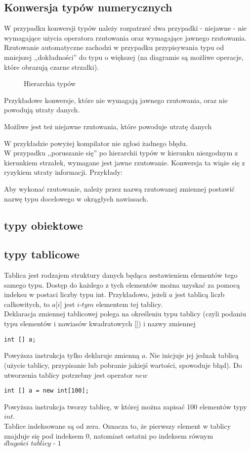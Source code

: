 \documentclass[11pt]{article}
\begin{document}
\subsection{Konwersja typów numerycznych}
W przypadku konwersji typów należy rozpatrzeć dwa przypadki - niejawne - nie wymagające użycia operatora rzutowania oraz wymagające jawnego rzutowania.
Rzutowanie automatyczne zachodzi w przypadku przypisywania typu od mniejszej ,,dokładności'' do typu o większej (na diagramie są możliwe operacje, które obrazują czarne strzałki). 
\begin{figure}
\centering
\caption{Hierarchia typów}
\end{figure}
Przykładowe konwersje, które nie wymagają jawnego rzutowania, oraz nie powodują utraty danych.

Możliwe jest też niejawne rzutowania, które powoduje utratę danych

W przykładzie powyżej kompilator nie zgłosi żadnego błędu.\\

W przypadku ,,poruszanie się'' po hierarchii typów w kierunku niezgodnym z kierunkiem strzałek, wymagane jest jawne rzutowanie. Konwersja ta wiąże się z ryzykiem utraty informacji. Przykłady:  

Aby wykonać rzutowanie, należy przez nazwą rzutowanej zmiennej postawić nazwę typu docelowego w okrągłych nawiasach.
\subsection{typy obiektowe}
\subsection{typy tablicowe} 
Tablica jest rodzajem struktury danych będąca zestawieniem elementów tego samego typu. Dostęp do każdego z tych elementów można uzyskać za pomocą indeksu w postaci liczby typu int. Przykładowo, jeżeli $\textit{a}$ jest tablicą liczb całkowitych, to $\textit{a[i]}$ jest $\textit{i-tym}$ elementem tej tablicy.\\
Deklaracja zmiennej tablicowej polega na określeniu typu tablicy (czyli podaniu typu elementów i nawiasów kwadratowych $\textit{[]}$) i nazwy zmiennej
\begin{lstlisting}
int [] a;
\end{lstlisting}
Powyższa instrukcja tylko deklaruje zmienną $\textit{a}$. Nie inicjuje jej jednak tablicą (użycie tablicy, przypisanie lub pobranie jakiejś wartości, spowoduje błąd). Do utworzenia tablicy potrzebny jest operator $\textit{new}$
\begin{lstlisting}
int [] a = new int[100];
\end{lstlisting}
Powyższa instrukcja tworzy tablicę, w której można zapisać 100 elementów typy $\textit{int}$.\\
Tablice indeksowane są od zera. Oznacza to, że pierwszy element w tablicy znajduje się pod indeksem 0, natomiast ostatni po indeksem równym $\textit{długości tablicy - 1}$
\end{document}
